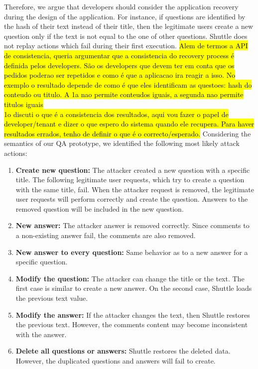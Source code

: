 Therefore, we argue that developers should consider the application recovery during the design of the application. For instance, if questions are identified by the hash of their text instead of their title, then the legitimate users create a new question only if the text is not equal to the one of other questions. Shuttle does not replay actions which fail during their first execution. \hl{Alem de termos a API de consistencia, queria argumentar que a consistencia do recovery process é definida pelos developers. São os developers que devem ter em conta que os pedidos poderao ser repetidos e como é que a aplicacao ira reagir a isso. No exemplo o resultado depende de como é que eles identificam as questoes: hash do conteudo ou titulo. A 1a nao permite conteudos iguais, a segunda nao permite titulos iguais}\\


\hl{1o discuti o que é a consistencia dos resultados, aqui vou fazer o papel de developer/tenant e dizer o que espero do sistema quando ele recupera. Para haver resultados errados, tenho de definir o que é o correcto/esperado.}
Considering the semantics of our \ac{QA} prototype, we identified the following most likely attack actions:

\begin{enumerate}
  \item \textbf{Create new question:} The attacker created a new question with a specific title. The following legitimate user requests, which try to create a question with the same title, fail. When the attacker request is removed, the legitimate user requests will perform correctly and create the question. Answers to the removed question will be included in the new question.
  \item \textbf{New answer:} The attacker answer is removed correctly. Since comments to a non-existing answer fail, the comments are also removed.
  \item \textbf{New answer to every question:} Same behavior as to a new answer for a specific question.
  \item \textbf{Modify the question:} The attacker can change the title or the text. The first case is similar to create a new answer. On the second case, Shuttle loads the previous text value.
  \item \textbf{Modify the answer:} If the attacker changes the text, then Shuttle restores the previous text. However, the comments content may become inconsistent with the answer.
  \item \textbf{Delete all questions or answers:} Shuttle restores the deleted data. However, the duplicated questions and answers will fail to create.
\end{enumerate}


